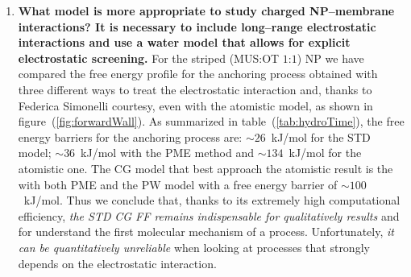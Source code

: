 \begin{enumerate}[label=\itshape\roman*.,listparindent=1em]
\begin{figure}[ht]
	\caption{Top: a charged ligand (orange beads) during the membrane translocation process: from the hydrophobic contact in the entrance leaflet to one anchor state in the opposite leaflet, forward process; and \textit{vice versa}, backward process. The dashed line is the \acs{COM} of the bilayer. Color code as in figure~(\ref{fig:NPSummary}). Water beads and lipid tails are not shown. Bottom: the related free energy profiles, separately for the forward (left panel) and the backward process (right panel), for the striped (green) and the random (violet) \acp{NP}.}
	\label{fig:coglionazzo}
\end{figure}%
\newpage
	\indent\textit{The future perspectives} may consist in more studies of these free energy profiles. In particular, how the free energy profiles of the translocation process depend on the number of ligands already anchored in the anchoring leaflet and if it is helped or hindered by other \acp{NP} embedded in the lipid bilayer. Moreover, we could aim at improving a few technical issues related to the free energy calculations. In particular, the phase space sampling could be made easier using more than a single collective variable during the metadynamics runs.

 	\item \textbf{\textsf{What model is more appropriate to study charged \ac{NP}--membrane interactions? It is necessary to include long--range electrostatic interactions and use a water model that allows for explicit electrostatic screening.}} For the striped (\acs{MUS}:\acs{OT} $1$:$1$) \ac{NP} we have compared the free energy profile for the anchoring process obtained with three different ways to treat the electrostatic interaction and, thanks to Federica Simonelli courtesy, even with the atomistic model, as shown in figure~(\ref{fig:forwardWall}). As summarized in table~(\ref{tab:hydroTime}), the free energy barriers for the anchoring process are: $\sim26$~kJ/mol for the \ac{STD} \martini model; $\sim36$~kJ/mol with the \ac{PME} method and $\sim134$~kJ/mol for the atomistic one. The \ac{CG} model that best approach the atomistic result is the \martini with both \ac{PME} and the \ac{PW} model with a free energy barrier of $\sim100$~kJ/mol. Thus we conclude that, thanks to its extremely high computational efficiency, \textit{the \ac{STD}} \martini \textit{\ac{CG} \ac{FF} remains indispensable for qualitatively results} and for understand the first molecular mechanism of a process. Unfortunately, \textit{it can be quantitatively unreliable} when looking at processes that strongly depends on the electrostatic interaction.


\end{enumerate}
